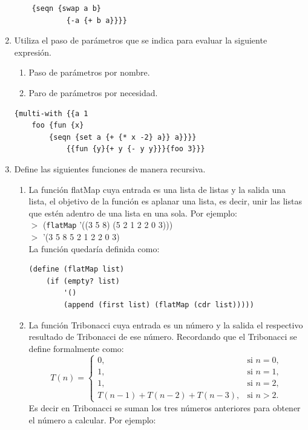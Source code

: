 \documentclass[11pt]{article}
\begin{document}
\begin{enumerate}[leftmargin=0.8cm]
\begin{lstlisting}
    {seqn {swap a b}
            {-a {+ b a}}}}
    \end{lstlisting}
    \item Utiliza el paso de parámetros que se indica para evaluar la siguiente expresión.
    \begin{enumerate}
        \item Paso de parámetros por nombre.
        \item Paro de parámetros por necesidad.\\
    \end{enumerate}
    \begin{lstlisting}
{multi-with {{a 1
    foo {fun {x}
        {seqn {set a {+ {* x -2} a}} a}}}}
            {{fun {y}{+ y {- y y}}}{foo 3}}}
    \end{lstlisting}
    \item Define las siguientes funciones de manera recursiva.
    \begin{enumerate}
        \item La función flatMap cuya entrada es una lista de listas y la salida una lista, el objetivo de la función es aplanar una lista, es decir, unir las listas que estén adentro de una lista en una sola. Por ejemplo:\\
        $>$ (\texttt{flatMap} '((3 5 8) (5 2 1 2 2 0 3)))\\
        $>$ '(3 5 8 5 2 1 2 2 0 3)\\
        La función quedaría definida como:
        \begin{lstlisting}
(define (flatMap list)
    (if (empty? list)
        '()
        (append (first list) (flatMap (cdr list)))))
        \end{lstlisting}
        \item La función Tribonacci cuya entrada es un número y la salida el respectivo resultado de Tribonacci de ese número. Recordando que el Tribonacci se define formalmente como:
        \[
            T(n) = \left\{ \begin{array}{ll}
                0, & \text{si } n= 0,\\
                1, & \text{si } n= 1,\\
                1, & \text{si } n= 2,\\
                T(n-1) + T(n-2) + T(n-3), & \text{si } n > 2.
            \end{array}\right.
        \]
        Es decir en Tribonacci se suman los tres números anteriores para obtener el número a calcular. Por ejemplo:\\

\end{enumerate}
\end{enumerate}
\end{document}
